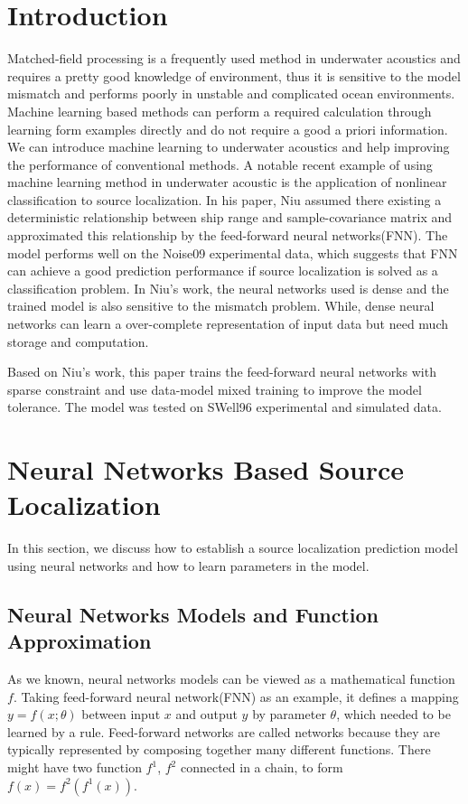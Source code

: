 \section{Introduction}
Matched-field processing is a frequently used method in underwater acoustics and requires a pretty good knowledge of environment, thus it is sensitive to the model mismatch and performs poorly in unstable and complicated ocean environments\cite{baggeroer1993overview}.
Machine learning based methods can perform a required calculation through learning form examples directly and do not require a good a priori information. We can introduce machine learning to underwater acoustics and help
improving the performance of conventional methods.
A notable recent example of using machine learning method in underwater acoustic is the application of nonlinear classification to source localization\cite{niu2017source}.
In his paper, Niu assumed there existing a deterministic relationship between ship range and sample-covariance matrix and approximated this relationship by the feed-forward neural networks(FNN).
The model performs well on the Noise09 experimental data, which suggests that FNN can achieve a good prediction performance if source localization is solved as a classification problem.
In Niu's work, the neural networks used is dense and the trained model is also sensitive to the mismatch problem. While, dense neural networks can learn a over-complete
representation of input data but need much storage and computation.

Based on Niu's work, this paper trains the feed-forward neural networks with sparse constraint and use data-model mixed training to improve the model tolerance. The model was tested on SWell96 experimental and simulated data.


\section{Neural Networks Based Source Localization}
In this section, we discuss how to establish a source localization prediction model using neural networks and how to learn parameters in the model.

\subsection{Neural Networks Models and Function Approximation}
As we known, neural networks models can be viewed as a mathematical function $f$. Taking feed-forward neural network(FNN) as an example, it defines a mapping ${{y}}=f(x;\theta )$ between input $x$ and output $y$ by parameter $\theta$, which needed to be learned by a rule. Feed-forward networks are called networks because they are typically represented by composing together many different functions. There might have two function $f^{1}$, $f^{2}$ connected in a chain\cite{goodfellow2016deep}, to form
$f(x) = f^{2}(f^{1}(x))$.

